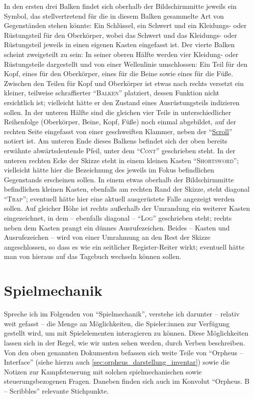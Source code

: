 \documentclass[a5paper,pagesize,numbers=noenddot]{scrbook}
\begin{document}
In den ersten drei Balken findet sich oberhalb der Bildschirmmitte jeweils ein Symbol, das stellvertretend für die in diesem Balken gesammelte Art von Gegenständen stehen könnte:
Ein Schlüssel, ein Schwert und ein Kleidungs- oder Rüstungsteil für den Oberkörper, wobei das Schwert und das Kleidungs- oder Rüstungsteil jeweils in einen eigenen Kasten eingefasst ist.
Der vierte Balken scheint zweigeteilt zu sein:
In seiner oberen Hälfte werden vier Kleidung- oder Rüstungsteile dargestellt und von einer Wellenlinie umschlossen:
Ein Teil für den Kopf, eines für den Oberkörper, eines für die Beine sowie eines für die Füße.
Zwischen den Teilen für Kopf und Oberkörper ist etwas nach rechts versetzt ein kleiner, teilweise schraffierter \enquote{\textsc{Balken}} platziert, dessen Funktion nicht ersichtlich ist; vielleicht hätte er den Zustand eines Ausrüstungsteils indizieren sollen. %
In der unteren Hälfte sind die gleichen vier Teile in unterschiedlicher Reihenfolge (Oberkörper, Beine, Kopf, Füße) noch einmal abgebildet, auf der rechten Seite eingefasst von einer geschweiften Klammer, neben der \enquote{\uline{Scroll}} notiert ist.
Am unteren Ende dieses Balkens befindet sich der oben bereits erwähnte abwärtsdeutende Pfeil, unter dem \enquote{\textsc{Cont}} geschrieben steht.
In der unteren rechten Ecke der Skizze steht in einem kleinen Kasten \enquote{\textsc{Shortsword}}; vielleicht hätte hier die Bezeichnung des jeweils im Fokus befindlichen Gegenstands erscheinen sollen. %
In einem etwas oberhalb der Bildschirmmitte befindlichen kleinen Kasten, ebenfalls am rechten Rand der Skizze, steht diagonal \enquote{\textsc{Trap}}; eventuell hätte hier eine aktuell ausgerüstete Falle angezeigt werden sollen. %
Auf gleicher Höhe ist rechts außerhalb der Umrandung ein weiterer Kasten eingezeichnet, in dem -- ebenfalls diagonal -- \enquote{\textsc{Log}} geschrieben steht; rechts neben dem Kasten prangt ein dünnes Ausrufezeichen.
Beides -- Kasten und Ausrufezeichen -- wird von einer Umrahmung an den Rest der Skizze angeschlossen, so dass es wie ein seitlicher Register-Reiter wirkt; eventuell hätte man von hieraus auf das Tagebuch wechseln können sollen.


\section{Spielmechanik}\label{sec:orpheus_mechanik}
Spreche ich im Folgenden von \enquote{Spielmechanik}, verstehe ich darunter -- relativ weit gefasst -- die Menge an Möglichkeiten, die Spieler:innen zur Verfügung gestellt wird, um mit Spielelementen interagieren zu können.\autocite[Vgl.][255]{jaervinen_games_2008}
Diese Möglichkeiten lassen sich in der Regel, wie wir unten sehen werden, durch Verben beschreiben.\autocite[Vgl.][263]{jaervinen_games_2008}
Von den oben genannten Dokumenten befassen sich weite Teile von \enquote{Orpheus -- Interface} (siehe hierzu auch \autoref{sec:orpheus_darstellung_inventar}) sowie die Notizen zur Kampfsteuerung mit solchen spielmechanischen sowie steuerungsbezogenen Fragen.
Daneben finden sich auch im Konvolut \enquote{Orpheus. B -- Scribbles} relevante Stichpunkte.
\end{document}
